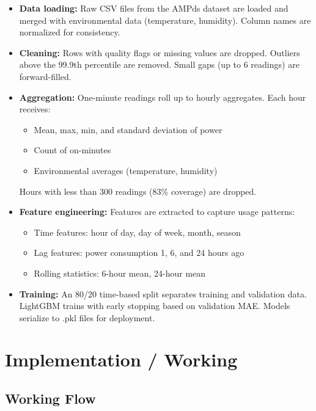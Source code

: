 \documentclass[12pt, a4paper]{article}
\begin{document}
	\begin{itemize}[itemsep=4pt, topsep=6pt]
		\item \textbf{Data loading:} Raw CSV files from the AMPds dataset are loaded and merged with environmental data (temperature, humidity). Column names are normalized for consistency.
		
		\item \textbf{Cleaning:} Rows with quality flags or missing values are dropped. Outliers above the 99.9th percentile are removed. Small gaps (up to 6 readings) are forward-filled.
		
		\item \textbf{Aggregation:} One-minute readings roll up to hourly aggregates. Each hour receives:
		\begin{itemize}[itemsep=1pt, topsep=2pt]
			\item Mean, max, min, and standard deviation of power
			\item Count of on-minutes
			\item Environmental averages (temperature, humidity)
		\end{itemize}
		Hours with less than 300 readings (83\% coverage) are dropped.
		
		\item \textbf{Feature engineering:} Features are extracted to capture usage patterns:
		\begin{itemize}[itemsep=1pt, topsep=2pt]
			\item Time features: hour of day, day of week, month, season
			\item Lag features: power consumption 1, 6, and 24 hours ago
			\item Rolling statistics: 6-hour mean, 24-hour mean
		\end{itemize}
		
		\item \textbf{Training:} An 80/20 time-based split separates training and validation data. LightGBM trains with early stopping based on validation MAE. Models serialize to .pkl files for deployment.
	\end{itemize}
	\newpage
	
	\section{Implementation / Working}
	
	\subsection{Working Flow}
	
\end{document}
